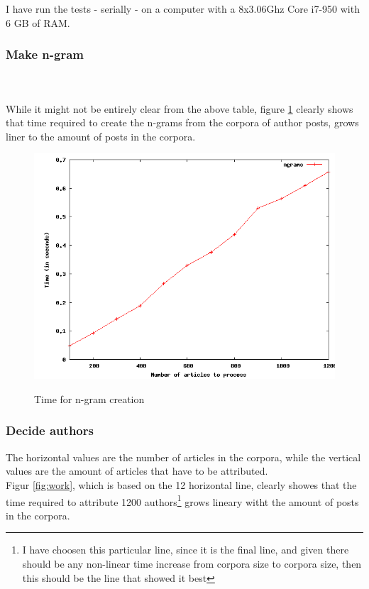 I have run the tests - serially - on a computer with a 8x3.06Ghz Core i7-950 with 6 GB of RAM. 

\subsubsection{Make n-gram}
\\ \\

While it might not be entirely clear from the above table, figure \ref{fig:ngram} clearly shows that time required to create the n-grams from the corpora of author posts, grows liner to the amount of posts in the corpora.

\begin{figure}[!hbp]
\includegraphics[width=\textwidth]{tabeller/ngram.png}\\
\caption{Time for n-gram creation\label{fig:ngram}}
\end{figure}

\subsubsection{Decide authors}

The horizontal values are the number of articles in the corpora, while the vertical values are the amount of articles that have to be attributed.\\


Figur \ref{fig:work}, which is based on the 12 horizontal line, clearly showes that the time required to attribute 1200 authors\footnote{I have choosen this particular line, since it is the final line, and given there should be any non-linear time increase from corpora size to corpora size, then this should be the line that showed it best} grows lineary witht the amount of posts in the corpora. 


